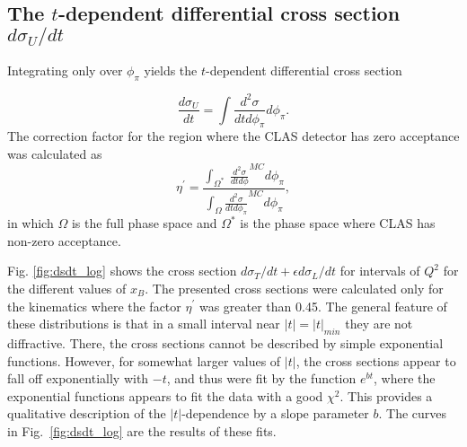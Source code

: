 \documentclass[prc,floatfix,twocolumn,superscriptaddress,letter]{revtex4}
\begin{document}
\subsection{The $t$-dependent differential cross section  ${d\sigma_U}/{dt}$}

Integrating only over $\phi_\pi$ yields the $t$-dependent differential cross section 

\begin{equation}
\frac{d\sigma_{U}}{dt}=\int  \frac{d^2 \sigma}{ dt d\phi_\pi}  d\phi_\pi.
\end{equation}
\noindent
The correction factor for  the region where
the CLAS detector has zero acceptance was calculated  as
\begin{equation}
\eta^\prime =\frac{\int_{\Omega^*} \ \frac{d^2 \sigma}{ dt d\phi}^{MC}  d\phi_\pi}
                   {\int _{\Omega}\frac{d^2 \sigma}{ dt d\phi_\pi}^{MC}  d\phi_\pi},
\end{equation}                   
\noindent
in which  $\Omega$ is the full phase space and $\Omega^*$ is the phase space where CLAS has non-zero acceptance.

Fig. \ref{fig:dsdt_log} shows the cross section  $d\sigma_T/dt+\epsilon d \sigma_L/dt$ for intervals of $Q^2$ for the different values of $x_B$. The presented cross sections were calculated only for the kinematics where the factor $\eta^\prime$ was greater than 0.45. The general feature of these distributions is that in a small interval near $|t|=|t|_{min}$ they are not diffractive. There, the cross sections cannot be described by simple exponential functions.  
However, for somewhat larger values of $\vert t \vert$, the cross sections appear to fall off exponentially with $-t$, and thus were fit by the function $e^{bt}$, where the exponential functions  appears to fit  the data with a good  $\chi^2$.  
This provides a qualitative  description of  the $|t|$-dependence by a slope parameter $b$.
The curves in Fig.~\ref{fig:dsdt_log} are the results of these fits.
\end{document}
